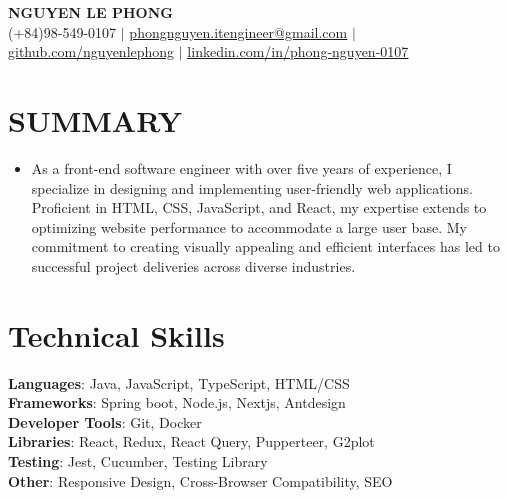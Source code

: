 \documentclass[letterpaper,11pt]{article}
\newcommand{\resumeItem}[1]{
  \item\small{
    {#1 \vspace{-2pt}}
  }
}
\newcommand{\resumeSubHeadingListStart}{\begin{itemize}[leftmargin=0.15in, label={}]}
\newcommand{\resumeSubHeadingListEnd}{\end{itemize}}
\begin{document}

\begin{center}
    \textbf{\Huge \scshape NGUYEN LE PHONG} \\ \vspace{1pt}
    \small (+84)98-549-0107 $|$ \href{mailto:phongnguyen.itengineer@gmail.com}{\underline{phongnguyen.itengineer@gmail.com}} $|$ 
    \href{https://github.com/nguyenlephong}{\underline{github.com/nguyenlephong}} $|$ 
    \href{https://www.linkedin.com/in/phong-nguyen-0107/}{\underline{linkedin.com/in/phong-nguyen-0107}}
\end{center}


\section{SUMMARY}
  \resumeSubHeadingListStart
    \resumeItem{As a front-end software engineer with over five years of experience, I specialize in designing and implementing user-friendly web applications. Proficient in HTML, CSS, JavaScript, and React, my expertise extends to optimizing website performance to accommodate a large user base. My commitment to creating visually appealing and efficient interfaces has led to successful project deliveries across diverse industries.}
    
  \resumeSubHeadingListEnd

\section{Technical Skills}
 \begin{itemize}[leftmargin=0.15in, label={}]
    \small{\item{
     \textbf{Languages}{: Java, JavaScript, TypeScript, HTML/CSS} \\
     \textbf{Frameworks}{: Spring boot, Node.js, Nextjs, Antdesign} \\
     \textbf{Developer Tools}{: Git, Docker} \\
     \textbf{Libraries}{: React, Redux, React Query, Pupperteer, G2plot}\\
     \textbf{Testing}{: Jest, Cucumber, Testing Library} \\
     \textbf{Other}{: Responsive Design, Cross-Browser Compatibility, SEO}
    }}
 \end{itemize}
\end{document}
